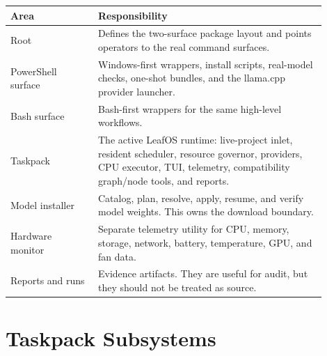 \documentclass[11pt,a4paper]{article}
\begin{document}
\begin{longtable}{@{}p{0.25\linewidth}p{0.65\linewidth}@{}}
\toprule
Area & Responsibility \\
\midrule
Root & Defines the two-surface package layout and points operators to the real command surfaces. \\
PowerShell surface & Windows-first wrappers, install scripts, real-model checks, one-shot bundles, and the llama.cpp provider launcher. \\
Bash surface & Bash-first wrappers for the same high-level workflows. \\
Taskpack & The active LeafOS runtime: live-project inlet, resident scheduler, resource governor, providers, CPU executor, TUI, telemetry, compatibility graph/node tools, and reports. \\
Model installer & Catalog, plan, resolve, apply, resume, and verify model weights. This owns the download boundary. \\
Hardware monitor & Separate telemetry utility for CPU, memory, storage, network, battery, temperature, GPU, and fan data. \\
Reports and runs & Evidence artifacts. They are useful for audit, but they should not be treated as source. \\
\bottomrule
\end{longtable}

\section*{Taskpack Subsystems}
\end{document}
